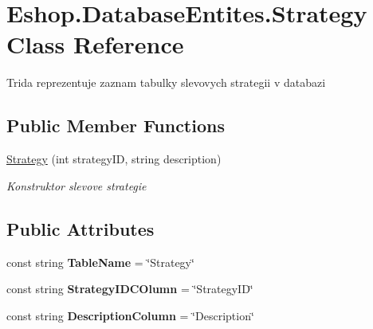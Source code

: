 \hypertarget{class_eshop_1_1_database_entites_1_1_strategy}{}\section{Eshop.\+Database\+Entites.\+Strategy Class Reference}
\label{class_eshop_1_1_database_entites_1_1_strategy}


Trida reprezentuje zaznam tabulky slevovych strategii v databazi  


\subsection*{Public Member Functions}
\begin{DoxyCompactItemize}
\item 
\mbox{\hyperlink{class_eshop_1_1_database_entites_1_1_strategy_a660444eda01a2a5517174c32c981a946}{Strategy}} (int strategy\+ID, string description)
\begin{DoxyCompactList}\small\item\em Konstruktor slevove strategie \end{DoxyCompactList}\end{DoxyCompactItemize}
\subsection*{Public Attributes}
\begin{DoxyCompactItemize}
\item 
\mbox{\label{class_eshop_1_1_database_entites_1_1_strategy_a0a9e1fa77ec0741f664c94e3f82a0d42}} 
const string {\bfseries Table\+Name} = \char`\"{}Strategy\char`\"{}
\item 
\mbox{\label{class_eshop_1_1_database_entites_1_1_strategy_a7200d5698d305d16fc5f75efd8bb21ee}} 
const string {\bfseries Strategy\+I\+D\+C\+Olumn} = \char`\"{}Strategy\+ID\char`\"{}
\item 
\mbox{\label{class_eshop_1_1_database_entites_1_1_strategy_a5ab1dd75c1de4a775cf96a2bbec94998}} 
const string {\bfseries Description\+Column} = \char`\"{}Description\char`\"{}
\end{DoxyCompactItemize}
